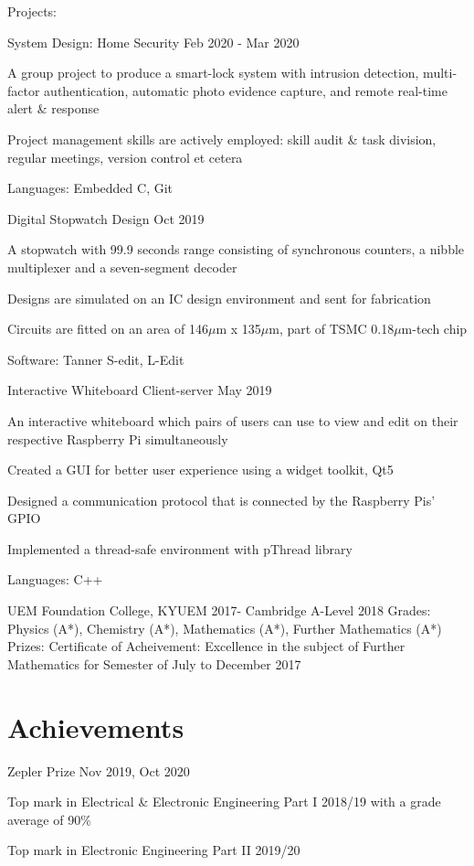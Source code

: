 \documentclass{myresume2}
\begin{document}
\twocolumnEntry
  {Projects:}
  {%
    \projectEntry
    {System Design: Home Security}
    {Feb 2020 - Mar 2020}
    {\item A group project to produce a smart-lock system with intrusion detection, multi-factor authentication, automatic photo evidence capture, and remote real-time alert \& response
    \item Project management skills are actively employed: skill audit \& task division, regular meetings, version control et cetera}
    {Languages: Embedded C, Git}

  \projectEntry
    {Digital Stopwatch Design}
    {Oct 2019}
    {\item A stopwatch with 99.9 seconds range consisting of synchronous counters, a nibble multiplexer and a seven-segment decoder
    \item Designs are simulated on an IC design environment and sent for fabrication
    \item Circuits are fitted on an area of 146$\mu$m x 135$\mu$m, part of TSMC 0.18$\mu$m-tech chip}
    {Software: Tanner S-edit, L-Edit}

  \projectEntry
    {Interactive Whiteboard Client-server}
    {May 2019}
    {\item An interactive whiteboard which pairs of users can use to view and edit on their respective Raspberry Pi simultaneously
    \item Created a GUI for better user experience using a widget toolkit, Qt5
    \item Designed a communication protocol that is connected by the Raspberry Pis' GPIO
    \item Implemented a thread-safe environment with pThread library}
    {Languages: C++}
  }

\headEntry
  {UEM Foundation College, KYUEM}
  {2017-}
  {Cambridge A-Level}
  {2018}
\twocolumnEntry
  {Grades:}
  {Physics (A*), Chemistry (A*), Mathematics (A*), Further Mathematics (A*)}
\twocolumnEntry
  {Prizes:}
  {Certificate of Acheivement: Excellence in the subject of Further Mathematics for Semester of July to December 2017}
%
%
%
%
\section{Achievements}
\simpleEntry
  {Zepler Prize}
  {Nov 2019, Oct 2020}
  {\item Top mark in Electrical \& Electronic Engineering Part I 2018/19 with a grade average of 90\%
  \item Top mark in Electronic Engineering Part II 2019/20}
\end{document}

